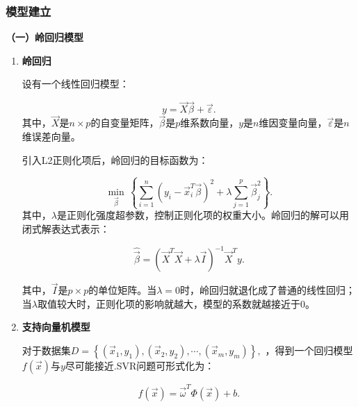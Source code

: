 \subsubsection{模型建立}

\textbf{（一）岭回归模型}

\begin{enumerate}
	\item \textbf{岭回归}
	
	设有一个线性回归模型：
	
	\begin{equation}
		y=\overrightarrow{X}\overrightarrow{\beta }+\overrightarrow{\varepsilon }.
	\end{equation}
	其中，$\overrightarrow{X}$是$n\times p$的自变量矩阵，$\overrightarrow{\beta }$是$p$维系数向量，$y$是$n$维因变量向量，$\overrightarrow{\varepsilon }$是$n$维误差向量。
	
	引入L2正则化项后，岭回归的目标函数为：
	
	\begin{equation}
		\underset{\overrightarrow{\beta }}{\mathop{\min }}\,\left\{ \sum\limits_{i=1}^{n}{{{\left( {{y}_{i}}-\overrightarrow{x}_{i}^{T}\overrightarrow{\beta } \right)}^{2}}+\lambda \sum\limits_{j=1}^{p}{\overrightarrow{\beta }_{j}^{2}}} \right\}.
	\end{equation}
	其中，$\lambda$是正则化强度超参数，控制正则化项的权重大小。岭回归的解可以用闭式解表达式表示：
	
	\begin{equation}
		\widehat{\overrightarrow{\beta }}={{\left( {{\overrightarrow{X}}^{T}}\overrightarrow{X}+\lambda \overrightarrow{I} \right)}^{-1}}{{\overrightarrow{X}}^{T}}y.
	\end{equation}
	
	其中，$\overrightarrow{I}$是$p\times p$的单位矩阵。当$\lambda =0$时，岭回归就退化成了普通的线性回归；当$\lambda$取值较大时，正则化项的影响就越大，模型的系数就越接近于0。
	
	
	
	\item \textbf{支持向量机模型}
	
	对于数据集$D=\left\{ \left( {{\overrightarrow{x}}_{1}},{{y}_{1}} \right),\left( {{\overrightarrow{x}}_{2}},{{y}_{2}} \right),\cdots ,\left( {{\overrightarrow{x}}_{m}},{{y}_{m}} \right) \right\},$ ，得到一个回归模型$f\left( \overrightarrow{x} \right)$与$y$尽可能接近.SVR问题可形式化为：
	
	\begin{equation}
		f\left( \overrightarrow{x} \right)={{\overrightarrow{\omega }}^{T}}\Phi \left( \overrightarrow{x} \right)+b.
	\end{equation}
	

\end{enumerate}
